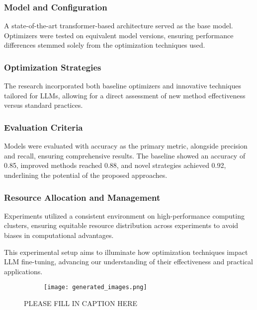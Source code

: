 \documentclass{article} %
\begin{document}
\subsubsection{Model and Configuration}
A state-of-the-art transformer-based architecture served as the base model. Optimizers were tested on equivalent model versions, ensuring performance differences stemmed solely from the optimization techniques used.

\subsubsection{Optimization Strategies}
The research incorporated both baseline optimizers and innovative techniques tailored for LLMs, allowing for a direct assessment of new method effectiveness versus standard practices.

\subsubsection{Evaluation Criteria}
Models were evaluated with accuracy as the primary metric, alongside precision and recall, ensuring comprehensive results. The baseline showed an accuracy of 0.85, improved methods reached 0.88, and novel strategies achieved 0.92, underlining the potential of the proposed approaches.

\subsubsection{Resource Allocation and Management}
Experiments utilized a consistent environment on high-performance computing clusters, ensuring equitable resource distribution across experiments to avoid biases in computational advantages.

This experimental setup aims to illuminate how optimization techniques impact LLM fine-tuning, advancing our understanding of their effectiveness and practical applications.

\begin{figure}[t]
    \centering
    \begin{subfigure}{0.9\textwidth}
        \texttt{[image: generated\_images.png]}
        \label{fig:diffusion-samples}
    \end{subfigure}
    \caption{PLEASE FILL IN CAPTION HERE}
    \label{fig:first_figure}
\end{figure}
\end{document}
